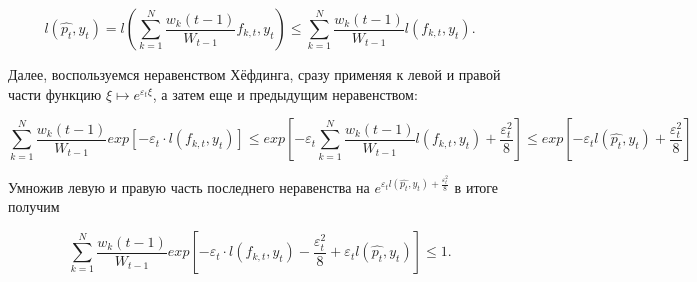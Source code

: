 \documentclass{article}
\begin{document}
\[ 
l(\hat{p_t}, y_t) = l(\sum^N_{k=1} \frac{w_k(t-1)}{W_{t-1}} f_{k,t}, y_t) \le \sum^N_{k=1} \frac{w_k(t-1)}{W_{t-1}} l(f_{k,t}, y_t). 
\]

Далее, воспользуемся неравенством Хёфдинга, сразу применяя к левой и правой части функцию $\xi \mapsto e^{\varepsilon_t \xi}$, а затем еще и предыдущим неравенством:

\[ 
\sum^N_{k=1} \frac{w_k(t-1)}{W_{t-1}} exp[-\varepsilon_t \cdot l(f_{k,t}, y_t)] \le 
exp[ - \varepsilon_t \sum^N_{k=1} \frac{w_k(t-1)}{W_{t-1}} l(f_{k,t}, y_t) + \frac{\varepsilon^2_t}{8} ] \le
exp[-\varepsilon_t l(\hat{p_t}, y_t) + \frac{\varepsilon^2_t}{8}]
\]

Умножив левую и правую часть последнего неравенства на $ e^{\varepsilon_t l(\hat{p_t}, y_t) + \frac{\varepsilon^2_t}{8}}$ в итоге получим

\begin{equation}
\sum^N_{k=1} \frac{w_k(t-1)}{W_{t-1}} exp[-\varepsilon_t \cdot l(f_{k,t}, y_t) - \frac{\varepsilon^2_t}{8} + \varepsilon_t l(\hat{p_t}, y_t) ] \le 1.
\end{equation}
\end{document}

